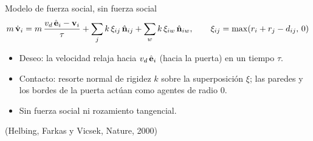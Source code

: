 \begin{frame}{Modelo de fuerza social, sin fuerza social}
  \small
  \[
    m\,\dot{\mathbf{v}}_i = m\,\frac{v_d\,\hat{\mathbf{e}}_i-\mathbf{v}_i}{\tau}
      + \sum_{j}k\,\xi_{ij}\,\hat{\mathbf{n}}_{ij} + \sum_{w}k\,\xi_{iw}\,\hat{\mathbf{n}}_{iw},
    \qquad \xi_{ij}=\max(r_i+r_j-d_{ij},\,0)
  \]
  \begin{itemize}
    \item Deseo: la velocidad relaja hacia $v_d\,\hat{\mathbf{e}}_i$ (hacia la puerta) en un tiempo $\tau$.
    \item Contacto: resorte normal de rigidez $k$ sobre la superposición $\xi$; las paredes y los
      bordes de la puerta actúan como agentes de radio $0$.
    \item Sin fuerza social ni rozamiento tangencial.
  \end{itemize}
  \vfill
  {\scriptsize (Helbing, Farkas y Vicsek, Nature, 2000)}
\end{frame}

